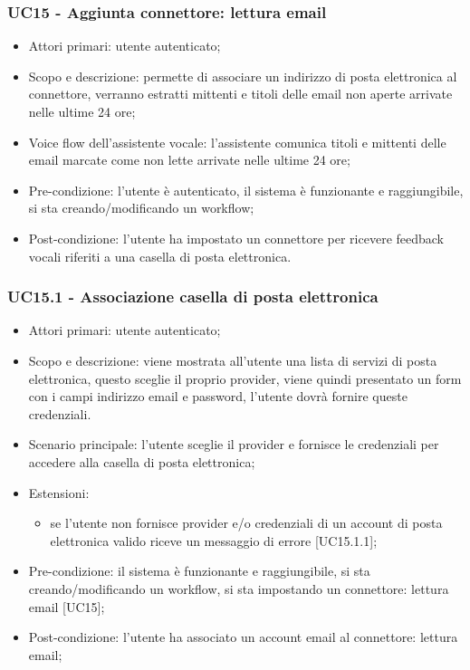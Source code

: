 \subsubsection{UC15 - Aggiunta connettore: lettura email}
\begin{itemize}
	\item  Attori primari: utente autenticato;
	\item  Scopo e descrizione: permette di associare un indirizzo di posta elettronica al connettore, verranno estratti mittenti e titoli delle email non aperte arrivate nelle ultime 24 ore;
	\item  Voice flow dell'assistente vocale: l'assistente comunica titoli e mittenti delle email marcate come non lette arrivate nelle ultime 24 ore;
	\item  Pre-condizione: l'utente è autenticato, il sistema è funzionante e raggiungibile, si sta creando/modificando un workflow;
	\item  Post-condizione: l'utente ha impostato un connettore per ricevere feedback vocali riferiti a una casella di posta elettronica.
\end{itemize}
\subsubsection{UC15.1 - Associazione casella di posta elettronica}
\begin{itemize}
	\item  Attori primari: utente autenticato;
	\item  Scopo e descrizione: viene mostrata all'utente una lista di servizi di posta elettronica, questo sceglie il proprio provider, viene quindi presentato un form con i campi indirizzo email e password, l'utente dovrà fornire queste credenziali.
	\item  Scenario principale: l'utente sceglie il provider e fornisce le credenziali per accedere alla casella di posta elettronica;
	\item  Estensioni:
		   \begin{itemize}
				\item  se l'utente non fornisce provider e/o credenziali di un account di posta elettronica valido riceve un messaggio di errore [UC15.1.1];
		   \end{itemize}
	\item  Pre-condizione: il sistema è funzionante e raggiungibile, si sta creando/modificando un workflow, si sta impostando un connettore: lettura email [UC15];
	\item  Post-condizione: l'utente ha associato un account email al connettore: lettura email;
\end{itemize}
